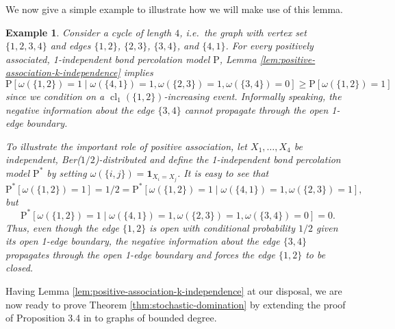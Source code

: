 \documentclass[11pt]{article}
\renewcommand{\P}{\mathrm{P}}
\DeclareMathOperator{\cl}{cl}
\newtheorem{example}{Example}
\theoremstyle{remark}
\begin{document}
We now give a simple example to illustrate how we will make use of this lemma. 
\begin{example}
	Consider a cycle of length $4$, i.e.\ the graph with vertex set $\{1,2,3,4\}$ and edges $\{1,2\}$, $\{2,3\}$, $\{3,4\}$, and $\{4,1\}$. 
    For every positively associated, 1-independent bond percolation model $\P$, Lemma \ref{lem:positive-association-k-independence} implies 
	\begin{equation}
		\P[\omega(\{1,2\})=1 \mid \omega(\{4,1\})=1, \omega(\{2,3\})=1,\omega(\{3,4\})=0] \ge  	\P[\omega(\{1,2\})=1]
	\end{equation}
    since we condition on a $\cl_1(\{1,2\})$-increasing event.
	Informally speaking, the negative information about the edge $\{3,4\}$ cannot propagate through the \emph{open} 1-edge boundary. 
 
    To illustrate the important role of positive association, let $X_1,\ldots,X_4$ be independent, Ber($1/2$)-distributed and define the 1-independent bond percolation model $\P^\ast$ by setting $\omega(\{i,j\})= \mathbf{1}_{X_i=X_j}$. It is easy to see that 
	\begin{equation}
		\P^\ast[\omega(\{1,2\})=1 ] = 1/2 = \P^\ast[\omega(\{1,2\})=1 \mid \omega(\{4,1\})=1, \omega(\{2,3\})=1],
	\end{equation}
	but 
	\begin{equation}
		\P^\ast[\omega(\{1,2\})=1 \mid \omega(\{4,1\})=1, \omega(\{2,3\})=1,\omega(\{3,4\})=0] = 0.
	\end{equation}
	Thus, even though the edge $\{1,2\}$ is open with conditional probability $1/2$ given its open 1-edge boundary, the negative information about the edge $\{3,4\}$ propagates through the \emph{open} 1-edge boundary and forces the edge $\{1,2\}$ to be closed. 
\end{example}

Having Lemma \ref{lem:positive-association-k-independence} at our disposal, we are now ready to prove Theorem \ref{thm:stochastic-domination} by extending the proof of Proposition 3.4 in \cite{Liggett1997} to graphs of bounded degree.
\end{document}
